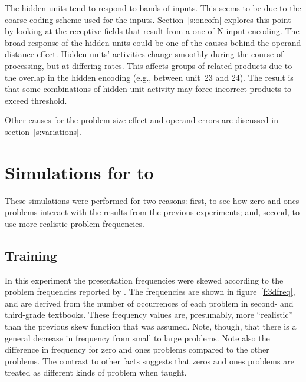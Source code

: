 The hidden units tend to respond to bands of inputs.  This seems to be due
to the coarse coding scheme used for the inputs.  Section~\ref{s:oneofn}
explores this point by looking at the receptive fields that result from a
one-of-N input encoding.
The broad response of the hidden units could be one of
the causes behind the operand distance effect. Hidden units' activities
change smoothly during the course of processing, but at differing rates.
This affects groups of related products due to the overlap in the hidden
encoding (e.g., between unit~23 and 24).  The result is that some
combinations of hidden unit activity may force incorrect
products to exceed threshold.

Other causes for the problem-size effect and operand errors are
discussed in section~\ref{s:variations}.




\section{Simulations for  to }\label{s:01sim}

These simulations were performed for two reasons: first, to see how zero
and ones problems interact with the results from the previous experiments;
and, second, to use more realistic problem frequencies.

\subsection{Training}\label{s:presfreq}

In this experiment the presentation frequencies were skewed according to
the problem frequencies reported by . The
frequencies are shown in figure~\ref{f:3dfreq}, and are derived from the
number of occurrences of each problem in second- and third-grade textbooks.
 These frequency values are, presumably, more ``realistic'' than the
previous skew function that was assumed.  Note, though, that there is a
general decrease in frequency from small to large problems.  Note also the
difference in frequency for zero and ones problems compared to the other
problems.  The contrast to other facts suggests that zeros and ones
problems are treated as different kinds of problem when taught.

